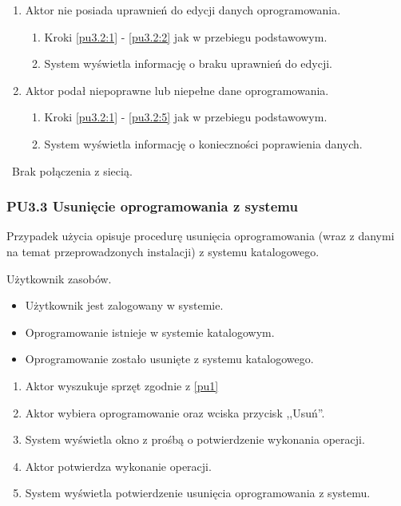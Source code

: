 \begin{enumerate}
\item Aktor nie posiada uprawnień do edycji danych oprogramowania.
	\begin{enumerate}[label*=\arabic*.]
		\item Kroki \ref{pu3.2:1} - \ref{pu3.2:2} jak w przebiegu podstawowym.
		\item System wyświetla informację o braku uprawnień do edycji.
	\end{enumerate}
\item Aktor podał niepoprawne lub niepełne dane oprogramowania.
	\begin{enumerate}[label*=\arabic*.]
		\item Kroki \ref{pu3.2:1} - \ref{pu3.2:5} jak w przebiegu podstawowym.
		\item System wyświetla informację o konieczności poprawienia danych.
	\end{enumerate}
\end{enumerate}

\
Brak połączenia z siecią.

\subsubsection{PU3.3 Usunięcie oprogramowania z systemu}

Przypadek użycia opisuje procedurę usunięcia oprogramowania (wraz z danymi na temat przeprowadzonych instalacji) z systemu katalogowego.

Użytkownik zasobów.

\begin{itemize}
\item Użytkownik jest zalogowany w systemie.
\item Oprogramowanie istnieje w systemie katalogowym.
\end{itemize}

\begin{itemize}
\item Oprogramowanie zostało usunięte z systemu katalogowego.
\end{itemize}

\begin{enumerate}
\item \label{pu3.3:1} Aktor wyszukuje sprzęt zgodnie z \ref{pu1}
\item \label{pu3.3:2} Aktor wybiera oprogramowanie oraz wciska przycisk ,,Usuń''.
\item System wyświetla okno z prośbą o potwierdzenie wykonania operacji.
\item Aktor potwierdza wykonanie operacji.
\item System wyświetla potwierdzenie usunięcia oprogramowania z systemu.
\end{enumerate}

